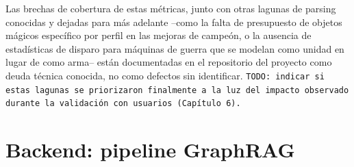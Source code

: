 \documentclass[11pt,a4paper,spanish]{book}
\numberwithin{equation}{chapter}
\numberwithin{figure}{chapter}
\numberwithin{table}{chapter}
\begin{document}
Las brechas de cobertura de estas métricas, junto con otras lagunas de parsing conocidas y dejadas para más adelante --como la falta de presupuesto de objetos mágicos específico por perfil en las mejoras de campeón, o la ausencia de estadísticas de disparo para máquinas de guerra que se modelan como unidad en lugar de como arma-- están documentadas en el repositorio del proyecto como deuda técnica conocida, no como defectos sin identificar. \texttt{TODO: indicar si estas lagunas se priorizaron finalmente a la luz del impacto observado durante la validación con usuarios (Capítulo 6).}

\section{Backend: pipeline GraphRAG}
\label{sec:backend}
\end{document}
